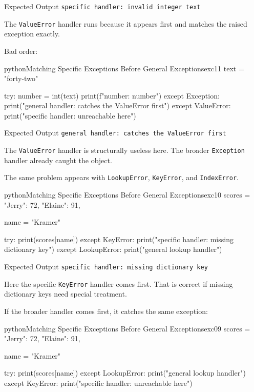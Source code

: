 \documentclass[a4paper,twoside]{report}
\begin{document}
\begin{iobox}{Expected Output}
\texttt{specific handler: invalid integer text} \\
\end{iobox}


The \texttt{ValueError} handler runs because it appears first and matches the raised exception exactly.

Bad order:

\begin{codebox}[]{python}{Matching Specific Exceptions Before General Exceptions}{exc11}
text = "forty-two"

try:
    number = int(text)
    print(f"number: {number}")
except Exception:
    print("general handler: catches the ValueError first")
except ValueError:
    print("specific handler: unreachable here")
\end{codebox}


\begin{iobox}{Expected Output}
\texttt{general handler: catches the ValueError first} \\
\end{iobox}


The \texttt{ValueError} handler is structurally useless here. The broader \texttt{Exception} handler already caught the object.

The same problem appears with \texttt{LookupError}, \texttt{KeyError}, and \texttt{IndexError}.

\begin{codebox}[]{python}{Matching Specific Exceptions Before General Exceptions}{exc10}
scores = {
    "Jerry": 72,
    "Elaine": 91,
}

name = "Kramer"

try:
    print(scores[name])
except KeyError:
    print("specific handler: missing dictionary key")
except LookupError:
    print("general lookup handler")
\end{codebox}


\begin{iobox}{Expected Output}
\texttt{specific handler: missing dictionary key} \\
\end{iobox}


Here the specific \texttt{KeyError} handler comes first. That is correct if missing dictionary keys need special treatment.

If the broader handler comes first, it catches the same exception:

\begin{codebox}[]{python}{Matching Specific Exceptions Before General Exceptions}{exc09}
scores = {
    "Jerry": 72,
    "Elaine": 91,
}

name = "Kramer"

try:
    print(scores[name])
except LookupError:
    print("general lookup handler")
except KeyError:
    print("specific handler: unreachable here")
\end{codebox}
\end{document}
